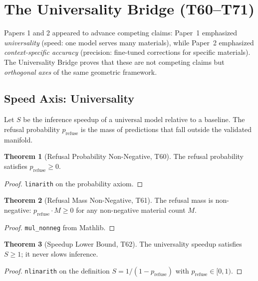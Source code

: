 \documentclass[11pt,a4paper]{article}
\theoremstyle{definition}
\newtheorem{theorem}{Theorem}[section]
\theoremstyle{plain}
\begin{document}
\section{The Universality Bridge (T60--T71)}
\label{sec:bridge}

Papers 1 and 2 appeared to advance competing claims: Paper~1 emphasized \emph{universality} (speed: one model serves many materials), while Paper~2 emphasized \emph{context-specific accuracy} (precision: fine-tuned corrections for specific materials). The Universality Bridge proves that these are not competing claims but \emph{orthogonal axes} of the same geometric framework.

\subsection{Speed Axis: Universality}
\label{subsec:speed}

Let $S$ be the inference speedup of a universal model relative to a baseline. The refusal probability $p_{\text{refuse}}$ is the mass of predictions that fall outside the validated manifold.

\begin{theorem}[Refusal Probability Non-Negative, T60]
\label{thm:refusenonneg}
The refusal probability satisfies $p_{\text{refuse}} \geq 0$.
\end{theorem}
\begin{proof}
\texttt{linarith} on the probability axiom.
\end{proof}

\begin{theorem}[Refusal Mass Non-Negative, T61]
\label{thm:prefusenonneg}
The refusal mass is non-negative: $p_{\text{refuse}} \cdot M \geq 0$ for any non-negative material count $M$.
\end{theorem}
\begin{proof}
\texttt{mul\_nonneg} from Mathlib.
\end{proof}

\begin{theorem}[Speedup Lower Bound, T62]
\label{thm:speedup}
The universality speedup satisfies $S \geq 1$; it never slows inference.
\end{theorem}
\begin{proof}
\texttt{nlinarith} on the definition $S = 1/(1 - p_{\text{refuse}})$ with $p_{\text{refuse}} \in [0,1)$.
\end{proof}
\end{document}
